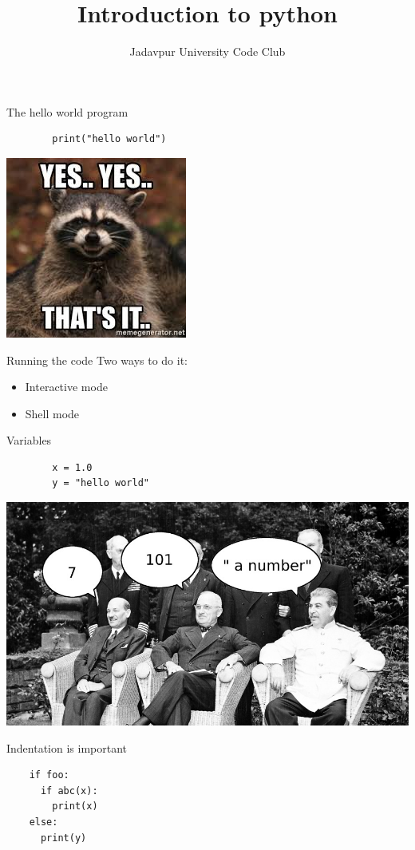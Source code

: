 \documentclass{beamer}
\title{Introduction to python}
\author{Jadavpur University Code Club}
\date{}
\begin{document}
\maketitle

\begin{frame}[fragile]{The hello world program}

	\begin{verbatim}
		print("hello world")
	\end{verbatim}

	\pause

	\begin{center}
		\includegraphics[width=.3\textwidth]{./img/images.jpg}
	\end{center}

\end{frame}

\begin{frame}[fragile]{Running the code}
	\Large{Two ways to do it:}
	\begin{itemize}
		\item Interactive mode
		\item Shell mode
	\end{itemize}
\end{frame}

\begin{frame}[fragile]{Variables}
	\begin{verbatim}
		x = 1.0
		y = "hello world"
	\end{verbatim}
	\begin{center}
		\includegraphics[width=.7\textwidth]{./img/variables.jpg}
	\end{center}
\end{frame}

\begin{frame}[fragile]{Indentation is important}

\begin{verbatim}
	if foo:
	  if abc(x):
	    print(x)
	else:
	  print(y)
\end{verbatim}


\end{frame}
\end{document}
